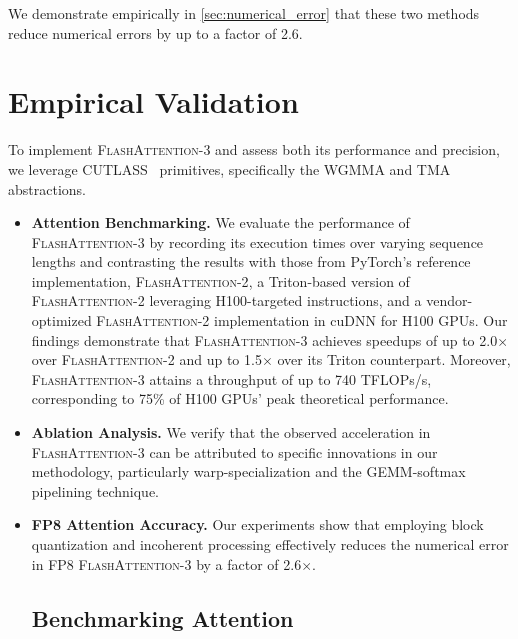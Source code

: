 \begin{enumerate}
\begin{enumerate}
\end{enumerate}

We demonstrate empirically in \cref{sec:numerical_error} that these two methods reduce numerical errors by up to a factor of 2.6.

\section{Empirical Validation}
\label{sec:exp}

To implement \textsc{FlashAttention-3} and assess both its performance and precision, we leverage CUTLASS~\citep{Thakkar_CUTLASS_2023} primitives, specifically the WGMMA and TMA abstractions.

\begin{itemize}

\item \textbf{Attention Benchmarking.} We evaluate the performance of \textsc{FlashAttention-3} by recording its execution times over varying sequence lengths and contrasting the results with those from PyTorch's reference implementation, \textsc{FlashAttention-2}, a Triton-based version of \textsc{FlashAttention-2} leveraging H100-targeted instructions, and a vendor-optimized \textsc{FlashAttention-2} implementation in cuDNN for H100 GPUs. Our findings demonstrate that \textsc{FlashAttention-3} achieves speedups of up to 2.0$\times$ over \textsc{FlashAttention-2} and up to 1.5$\times$ over its Triton counterpart. Moreover, \textsc{FlashAttention-3} attains a throughput of up to 740 TFLOPs/s, corresponding to 75\% of H100 GPUs' peak theoretical performance.
\item \textbf{Ablation Analysis.} We verify that the observed acceleration in \textsc{FlashAttention-3} can be attributed to specific innovations in our methodology, particularly warp-specialization and the GEMM-softmax pipelining technique.
\item \textbf{FP8 Attention Accuracy.} Our experiments show that employing block quantization and incoherent processing effectively reduces the numerical error in FP8 \textsc{FlashAttention-3} by a factor of 2.6$\times$.

\subsection{Benchmarking Attention}
\label{subsec:benchmark_attn}


\end{itemize}
\end{enumerate}
